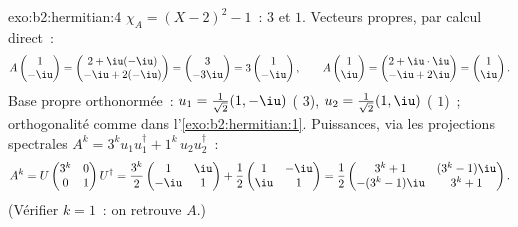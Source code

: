 \begin{solution}{exo:b2:hermitian:4}
$\chi_A = (X-2)^2 - 1$~:  $3$ et $1$. Vecteurs propres,
par calcul direct~:
\[
A\begin{pmatrix}1\\ -\iu\end{pmatrix}
= \begin{pmatrix} 2 + \iu(-\iu)\\ -\iu + 2(-\iu)\end{pmatrix}
= \begin{pmatrix} 3\\ -3\iu \end{pmatrix}
= 3\begin{pmatrix}1\\ -\iu\end{pmatrix},
\qquad
A\begin{pmatrix}1\\ \iu\end{pmatrix}
= \begin{pmatrix} 2 + \iu\cdot\iu\\ -\iu + 2\iu\end{pmatrix}
= \begin{pmatrix}1\\ \iu\end{pmatrix}.
\]
Base propre orthonormée~: $u_1 = \frac{1}{\sqrt2}(1, -\iu)$
( $3$), $u_2 = \frac{1}{\sqrt2}(1, \iu)$ (
$1$)~; orthogonalité comme dans l'\cref{exo:b2:hermitian:1}. Puissances, via
les projections spectrales $A^k = 3^k u_1u_1^\dagger + 1^k\,
u_2u_2^\dagger$~:
\[
A^k = U\begin{pmatrix} 3^k & 0\\ 0 & 1\end{pmatrix}U^\dagger
= \frac{3^k}{2}\begin{pmatrix} 1 & \iu\\ -\iu & 1\end{pmatrix}
+ \frac{1}{2}\begin{pmatrix} 1 & -\iu\\ \iu & 1\end{pmatrix}
= \frac12\begin{pmatrix}
3^k + 1 & (3^k - 1)\iu\\
-(3^k-1)\iu & 3^k + 1
\end{pmatrix}.
\]
(Vérifier $k = 1$~: on retrouve $A$.)
\end{solution}

